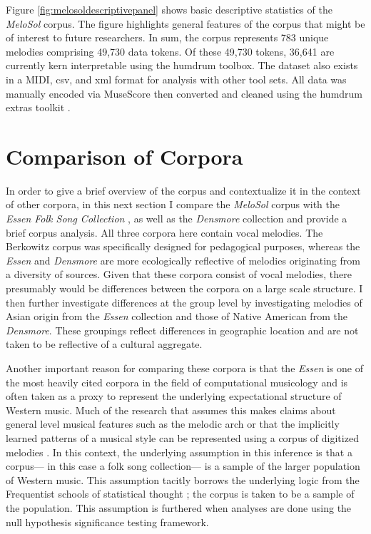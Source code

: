 \documentclass[12pt,]{book}
\begin{document}
Figure \ref{fig:melosoldescriptivepanel} shows basic descriptive statistics of the \emph{MeloSol} corpus.
The figure highlights general features of the corpus that might be of interest to future researchers.
In sum, the corpus represents 783 unique melodies comprising 49,730 data tokens.
Of these 49,730 tokens, 36,641 are currently kern interpretable using the humdrum toolbox.
The dataset also exists in a MIDI, csv, and xml format for analysis with other tool sets.
All data was manually encoded via MuseScore then converted and cleaned using the humdrum extras toolkit \citep{sappHumdrumExtras2008, wernerMuseScore2019}.

\hypertarget{comparison-of-corpora}{%
\section{Comparison of Corpora}\label{comparison-of-corpora}}

In order to give a brief overview of the corpus and contextualize it in the context of other corpora, in this next section I compare the \emph{MeloSol} corpus with the \emph{Essen Folk Song Collection} \citep{schaffrathEssenFolkSong1995}, as well as the \emph{Densmore} collection \citep{shanahanDensmoreCollectionNative2014} and provide a brief corpus analysis.
All three corpora here contain vocal melodies.
The Berkowitz corpus was specifically designed for pedagogical purposes, whereas the \emph{Essen} and \emph{Densmore} are more ecologically reflective of melodies originating from a diversity of sources.
Given that these corpora consist of vocal melodies, there presumably would be differences between the corpora on a large scale structure.
I then further investigate differences at the group level by investigating melodies of Asian origin from the \emph{Essen} collection and those of Native American from the \emph{Densmore}.
These groupings reflect differences in geographic location and are not taken to be reflective of a cultural aggregate.

Another important reason for comparing these corpora is that the \emph{Essen} is one of the most heavily cited corpora in the field of computational musicology and is often taken as a proxy to represent the underlying expectational structure of Western music.
Much of the research that assumes this makes claims about general level musical features such as the melodic arch \citep{huronMelodicArchWestern1996, shanahanExaminingEffectOral2019} or that the implicitly learned patterns of a musical style can be represented using a corpus of digitized melodies \citep{demorestQuantifyingCulture2015, pearceStatisticalLearningProbabilistic2018a}.
In this context, the underlying assumption in this inference is that a corpus--- in this case a folk song collection--- is a sample of the larger population of Western music.
This assumption tacitly borrows the underlying logic from the Frequentist schools of statistical thought \citep{dienesUnderstandingPsychologyScience2008}; the corpus is taken to be a sample of the population.
This assumption is furthered when analyses are done using the null hypothesis significance testing framework.
\end{document}
